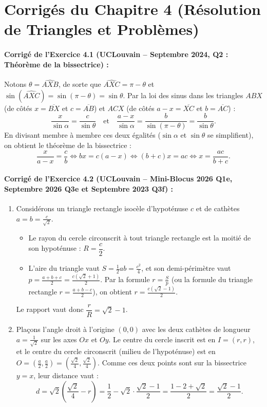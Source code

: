 \section{Corrigés du Chapitre 4 (Résolution de Triangles et Problèmes)}

\paragraph{Corrigé de l'Exercice 4.1 (UCLouvain -- Septembre 2024, Q2 : Théorème de la bissectrice) :}
Notons $\theta = \widehat{AXB}$, de sorte que $\widehat{AXC} = \pi - \theta$ et $\sin(\widehat{AXC}) = \sin(\pi-\theta) = \sin\theta$. Par la loi des sinus dans les triangles $ABX$ (de côtés $x = \overline{BX}$ et $c = \overline{AB}$) et $ACX$ (de côtés $a-x = \overline{XC}$ et $b = \overline{AC}$) :
\[
    \frac{x}{\sin\alpha} = \frac{c}{\sin\theta} \quad \text{et} \quad \frac{a-x}{\sin\alpha} = \frac{b}{\sin(\pi-\theta)} = \frac{b}{\sin\theta}.
\]
En divisant membre à membre ces deux égalités ($\sin\alpha$ et $\sin\theta$ se simplifient), on obtient le théorème de la bissectrice :
\[
    \frac{x}{a-x} = \frac{c}{b} \iff bx = c(a-x) \iff (b+c)x = ac \iff \boxed{x = \frac{ac}{b+c}}.
\]

\paragraph{Corrigé de l'Exercice 4.2 (UCLouvain -- Mini-Blocus 2026 Q1e, Septembre 2026 Q3e et Septembre 2023 Q3f) :}
\begin{enumerate}[label=(\alph*)]
    \item Considérons un triangle rectangle isocèle d'hypoténuse $c$ et de cathètes $a = b = \frac{c}{\sqrt{2}}$.
    \begin{itemize}
        \item Le rayon du cercle circonscrit à tout triangle rectangle est la moitié de son hypoténuse : $R = \dfrac{c}{2}$.
        \item L'aire du triangle vaut $S = \frac{1}{2}ab = \frac{c^2}{4}$, et son demi-périmètre vaut $p = \frac{a+b+c}{2} = \frac{c(\sqrt{2}+1)}{2}$. Par la formule $r = \frac{S}{p}$ (ou la formule du triangle rectangle $r = \frac{a+b-c}{2}$), on obtient $r = \frac{c(\sqrt{2}-1)}{2}$.
    \end{itemize}
    Le rapport vaut donc $\dfrac{r}{R} = \boxed{\sqrt{2} - 1}$.
    \item Plaçons l'angle droit à l'origine $(0,0)$ avec les deux cathètes de longueur $a = \frac{1}{\sqrt{2}}$ sur les axes $Ox$ et $Oy$. Le centre du cercle inscrit est en $I = (r, r)$, et le centre du cercle circonscrit (milieu de l'hypoténuse) est en $O = \left(\frac{a}{2}, \frac{a}{2}\right) = \left(\frac{\sqrt{2}}{4}, \frac{\sqrt{2}}{4}\right)$. Comme ces deux points sont sur la bissectrice $y=x$, leur distance vaut :
    \[
        d = \sqrt{2}\left(\frac{\sqrt{2}}{4} - r\right) = \frac{1}{2} - \sqrt{2}\cdot\frac{\sqrt{2}-1}{2} = \frac{1 - 2 + \sqrt{2}}{2} = \boxed{\frac{\sqrt{2}-1}{2}}.
    \]
\end{enumerate}

